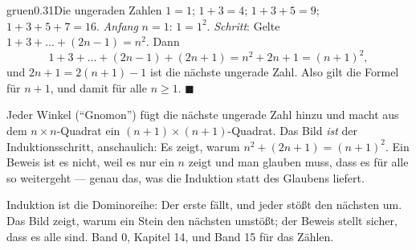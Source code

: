 \begin{loesungkarte}{gruen}{0.31}{Die ungeraden Zahlen}
$1 = 1$; $1 + 3 = 4$; $1 + 3 + 5 = 9$; $1 + 3 + 5 + 7 = 16$. \checkmark
{}
\emph{Anfang} $n = 1$: $1 = 1^{2}$. \emph{Schritt}: Gelte $1 + 3 + \dots + (2n - 1) = n^{2}$. Dann
\[ 1 + 3 + \dots + (2n - 1) + (2n + 1) = n^{2} + 2n + 1 = (n + 1)^{2}, \]
und $2n + 1 = 2(n + 1) - 1$ ist die nächste ungerade Zahl. Also gilt die Formel für $n + 1$, und damit für alle $n\ge1$. $\blacksquare$
\begin{center}
\end{center}
Jeder Winkel (\enquote{Gnomon}) fügt die nächste ungerade Zahl hinzu und macht aus dem $n\times n$-Quadrat ein $(n + 1)\times(n + 1)$-Quadrat. Das Bild \emph{ist} der Induktionsschritt, anschaulich: Es zeigt, warum $n^{2} + (2n + 1) = (n + 1)^{2}$. Ein Beweis ist es nicht, weil es nur ein $n$ zeigt und man glauben muss, dass es für alle so weitergeht --- genau das, was die Induktion statt des Glaubens liefert.
\begin{mitnehmen}\kastentext
Induktion ist die Dominoreihe: Der erste fällt, und jeder stößt den nächsten um. Das Bild zeigt, warum ein Stein den nächsten umstößt; der Beweis stellt sicher, dass es alle sind. Band 0, Kapitel 14, und Band 15 für das Zählen.
\end{mitnehmen}
\end{loesungkarte}
